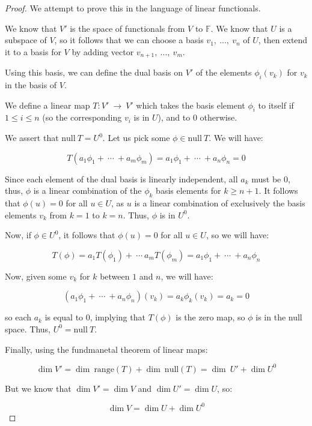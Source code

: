 \documentclass[10pt, oneside]{article}
\begin{document}
    \begin{proof}

      We attempt to prove this in the language of linear functionals.
      \newline

      We know that $V'$ is the space of functionals from $V$ to $\mathbb{F}$. We know that $U$ is a subspace of $V$,
      so it follows that we can choose a basis $v_1, \ ..., \ v_n$ of $U$, then extend it to a basis for $V$ by adding
      vector $v_{n + 1}, \ ..., \ v_m$.
      \newline

      Using this basis, we can define the dual basis on $V'$ of the elements $\phi_{i}(v_k)$ for $v_k$ in the basis of $V$.
      \newline

      We define a linear map $T : V' \ \rightarrow \ V'$ which takes the basis element $\phi_i$ to itself if $1 \leq i \leq n$ (so the
      corresponding $v_i$ is in $U$), and to $0$ otherwise.
      \newline

      We assert that $\text{null} \ T = U^0$. Let us pick some $\phi \in \text{null} \ T$. We will have:

      $$T(a_1 \phi_1 + \ \cdots \ + a_m \phi_m) = a_1 \phi_1 + \ \cdots \ + a_n \phi_n = 0$$

      Since each element of the dual basis is linearly independent, all $a_k$ must be $0$, thus, $\phi$ is a linear combination of the $\phi_k$ basis elements for $k \geq n + 1$.
      It follows that $\phi(u) = 0$ for all $u \in U$, as $u$ is a linear combination of exclusively the basis elements $v_k$ from $k = 1$ to $k = n$. Thus, $\phi$ is in $U^0$.
      \newline

      Now, if $\phi \in U^0$, it follows that $\phi(u) = 0$ for all $u \in U$, so we will have:

      $$T(\phi) = a_1 T(\phi_1) + \ \cdots \ a_m T(\phi_m) = a_1 \phi_1 + \ \cdots \ + a_n \phi_n$$

      Now, given some $v_k$ for $k$ between $1$ and $n$, we will have:

      $$(a_1 \phi_1 + \ \cdots \ + a_n \phi_n)(v_k) = a_k \phi_k(v_k) = a_k = 0$$

      so each $a_k$ is equal to $0$, implying that $T(\phi)$ is the zero map, so $\phi$ is in the null space. Thus, $U^0 = \text{null} \ T$.
      \newline

      Finally, using the fundmanetal theorem of linear maps:

      $$\dim V' = \dim \ \text{range}(T) + \dim \ \text{null}(T) = \dim \ U' + \dim U^0$$

      But we know that $\dim V' = \dim V$ and $\dim U' = \dim U$, so:

      $$\dim V = \dim U + \dim U^0$$

    \end{proof}
\end{document}
